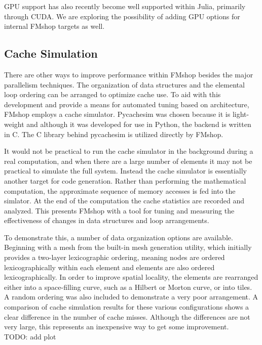 \documentclass[twoside,leqno,twocolumn]{article}
\begin{document}
GPU support has also recently become well supported within Julia\cite{juliagpu}, primarily through CUDA. We are exploring the possibility of adding GPU options for internal FMshop targets as well.

\subsection{Cache Simulation}
There are other ways to improve performance within FMshop besides the major parallelism techniques. The organization of data structures and the elemental loop ordering can be arranged to optimize cache use. To aid with this development and provide a means for automated tuning based on architecture, FMshop employs a cache simulator. Pycachesim\cite{pycachesim} was chosen because it is light-weight and although it was developed for use in Python, the backend is written in C. The C library behind pycachesim is utilized directly by FMshop. 

It would not be practical to run the cache simulator in the background during a real computation, and when there are a large number of elements it may not be practical to simulate the full system. Instead the cache simulator is essentially another target for code generation. Rather than performing the mathematical computation, the approximate sequence of memory accesses is fed into the simlator. At the end of the computation the cache statistics are recorded and analyzed. This presents FMshop with a tool for tuning and measuring the effectiveness of changes in data structures and loop arrangements.

To demonstrate this, a number of data organization options are available. Beginning with a mesh from the built-in mesh generation utility, which initially provides a two-layer lexicographic ordering, meaning nodes are ordered lexicographically within each element and elements are also ordered lexicographically. In order to improve spatial locality, the elements are rearranged either into a space-filling curve, such as a Hilbert or Morton curve, or into tiles. A random ordering was also included to demonstrate a very poor arrangement. A comparison of cache simulation results for these various configurations shows a clear difference in the number of cache misses. Although the differences are not very large, this represents an inexpensive way to get some improvement. 
\\

TODO: add plot
\\
\end{document}
